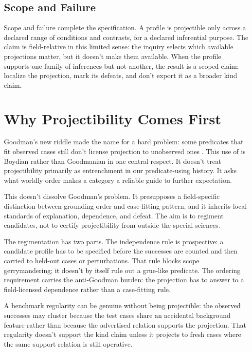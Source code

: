 \documentclass[12pt]{article}
\begin{document}
\subsection{Scope and Failure}

Scope and failure complete the specification. A profile is projectible only
across a declared range of conditions and contrasts, for a declared inferential
purpose. The claim is field-relative in this limited sense: the inquiry selects
which available projections matter, but it doesn't make them available. When the
profile supports one family of inferences but not another, the result is a scoped
claim: localize the projection, mark its defeats, and don't export it as a
broader kind claim.

\section{Why Projectibility Comes First}

Goodman's new riddle made  the name for a hard problem:
some predicates that fit observed cases still don't license projection to
unobserved ones \citep{Goodman1955}. This use of  is Boydian
rather than Goodmanian in one central respect. It doesn't treat projectibility
primarily as entrenchment in our predicate-using history. It asks what worldly
order makes a category a reliable guide to further expectation.

This doesn't dissolve Goodman's problem. It presupposes a field-specific
distinction between grounding order and case-fitting pattern, and it inherits
local standards of explanation, dependence, and defeat. The aim is to regiment
candidates, not to certify projectibility from outside the special sciences.

The regimentation has two parts. The independence rule is prospective: a
candidate profile has to be specified before the successes are counted and then
carried to held-out cases or perturbations. That rule blocks scope
gerrymandering; it doesn't by itself rule out a grue-like predicate. The ordering
requirement carries the anti-Goodman burden: the projection has to answer to a
field-licensed dependence rather than a case-fitting rule.

A benchmark regularity can be genuine without being projectible: the observed
successes may cluster because the test cases share an accidental background
feature rather than because the advertised relation supports the projection.
That regularity doesn't support the kind claim unless it projects to fresh cases
where the same support relation is still operative.
\end{document}
